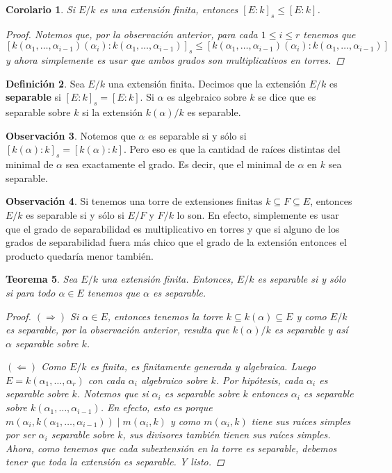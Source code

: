 \documentclass[12pt]{book}
\newtheorem{teo}{Teorema}[section]
\newtheorem{cor}[teo]{Corolario}
\theoremstyle{definition}
\newtheorem{obs}[teo]{Observación}
\newtheorem{defn}[teo]{Definición}
\begin{document}
\begin{cor}
Si $E/k$ es una extensión finita, entonces $[E:k]_s \leq [E:k]$.
\begin{proof}
Notemos que, por la observación anterior, para cada $1\leq i\leq r$ tenemos que $[k(\alpha_1,\ldots ,\alpha_{i-1})(\alpha_i) : k(\alpha_1,\ldots , \alpha_{i-1})]_s \leq [k(\alpha_1,\ldots ,\alpha_{i-1})(\alpha_i) : k(\alpha_1,\ldots , \alpha_{i-1})]$ y ahora simplemente es usar que ambos grados son multiplicativos en torres.
\end{proof}
\end{cor}

\begin{defn}
Sea $E/k$ una extensión finita. Decimos que la extensión $E/k$ es \textbf{separable} si $[E:k]_s = [E:k]$. Si $\alpha$ es algebraico sobre $k$ se dice que es separable sobre $k$ si la extensión $k(\alpha)/k$ es separable.
\end{defn}

\begin{obs}
Notemos que $\alpha$ es separable si y sólo si $[k(\alpha):k]_s = [k(\alpha):k]$. Pero eso es que la cantidad de raíces distintas del minimal de $\alpha$ sea exactamente el grado. Es decir, que el minimal de $\alpha$ en $k$ sea separable.
\end{obs}

\begin{obs}
Si tenemos una torre de extensiones finitas $k\subseteq F\subseteq E$, entonces $E/k$ es separable si y sólo si $E/F$ y $F/k$ lo son. En efecto, simplemente es usar que el grado de separabilidad es multiplicativo en torres y que si alguno de los grados de separabilidad fuera más chico que el grado de la extensión entonces el producto quedaría menor también.
\end{obs}

\begin{teo}
Sea $E/k$ una extensión finita. Entonces, $E/k$ es separable si y sólo si para todo $\alpha\in E$ tenemos que $\alpha$ es separable.
\begin{proof}
$(\Longrightarrow)$ Si $\alpha\in E$, entonces tenemos la torre $k\subseteq k(\alpha)\subseteq E$ y como $E/k$ es separable, por la observación anterior, resulta que $k(\alpha)/k$ es separable y así $\alpha$ separable sobre $k$.

$(\Longleftarrow)$ Como $E/k$ es finita, es finitamente generada y algebraica. Luego $E=k(\alpha_1,\ldots ,\alpha_r)$ con cada $\alpha_i$ algebraico sobre $k$. Por hipótesis, cada $\alpha_i$ es separable sobre $k$. Notemos que si $\alpha_i$ es separable sobre $k$ entonces $\alpha_i$ es separable sobre $k(\alpha_1,\ldots , \alpha_{i-1})$. En efecto, esto es porque $m(\alpha_i, k(\alpha_1,\ldots ,\alpha_{i-1}))\mid m(\alpha_i,k)$ y como $m(\alpha_i,k)$ tiene sus raíces simples por ser $\alpha_i$ separable sobre $k$, sus divisores también tienen sus raíces simples. Ahora, como tenemos que cada subextensión en la torre es separable, debemos tener que toda la extensión es separable. Y listo.
\end{proof}
\end{teo}
\end{document}
